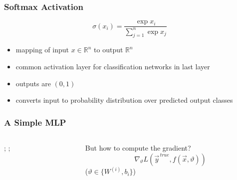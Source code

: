 \documentclass[
  aspectratio=1610, %
  intlimits %
]{beamer}
\begin{document}
 \begin{frame}
 \frametitle{Softmax Activation}
 \begin{equation*}
\sigma(x_i) = \frac{\exp{x_i}}{\sum_{j=1}^{n} \exp{x_j}}
\end{equation*}
\begin{itemize}
\item mapping of input $x \in \mathbb{R}^n$ to output $\mathbb{R}^n$
\item common activation layer for classification networks in last layer
\item outputs are $(0,1)$
\item converts input to probability distribution over predicted output classes
\end{itemize}
\end{frame}

\renewcommand{\inText}[1]{
 $I_{#1}$
}
\renewcommand{\hidText}[1]{
 {$F_{relu}(H_{#1})$}%
}
\renewcommand{\outText}[1]{
 $F_{smax}(O_{#1})$%
}
\renewcommand{\synapseIHText}[2]{%
 {\ifthenelse{\equal{#1}{1}}{}{\small$W^{(I)}_{#1#2}$}}}
\renewcommand{\synapseHOText}[2]{\small$W^{(H)}_{#1#2}$}

 \begin{frame}
 \frametitle{A Simple MLP}

 \begin{columns}
   \begin{column}{.7\textwidth}
     {;
       ;
     }
   \end{column}
   \begin{column}{.28\textwidth}
     
     \begin{exampleblock}{But how to compute the gradient?}
       \vspace{-1em}
       \Large
       \begin{equation*}
         \nabla_{\vartheta}L ( \vec{y}^{\,true}, f(\vec{x}, \vartheta) )
       \end{equation*}
       \small
       \centering
     ($\vartheta \in \{W^{(i)}, b_i\}$)
   \end{exampleblock}
     
   \end{column}
 \end{columns}
 
\end{frame}
\end{document}
